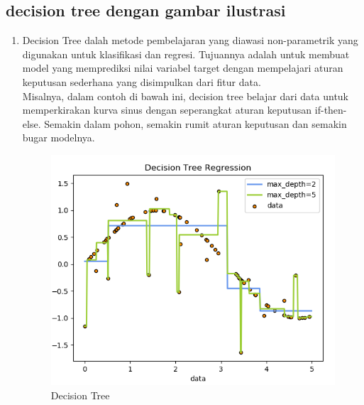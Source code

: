 \subsection{decision tree dengan gambar ilustrasi}
\begin{enumerate}
\item Decision Tree dalah metode pembelajaran yang diawasi non-parametrik yang digunakan untuk klasifikasi dan regresi. Tujuannya adalah untuk membuat model yang memprediksi nilai variabel target dengan mempelajari aturan keputusan sederhana yang disimpulkan dari fitur data.\\
Misalnya, dalam contoh di bawah ini, decision tree belajar dari data untuk memperkirakan kurva sinus dengan seperangkat aturan keputusan if-then-else. Semakin dalam pohon, semakin rumit aturan keputusan dan semakin bugar modelnya.
\begin{figure}[ht]
\centering
\includegraphics[scale=0.5]{figures/wiendh6.png}
\caption{Decision Tree}
\label{contoh}
\end{figure}
\end{enumerate}

